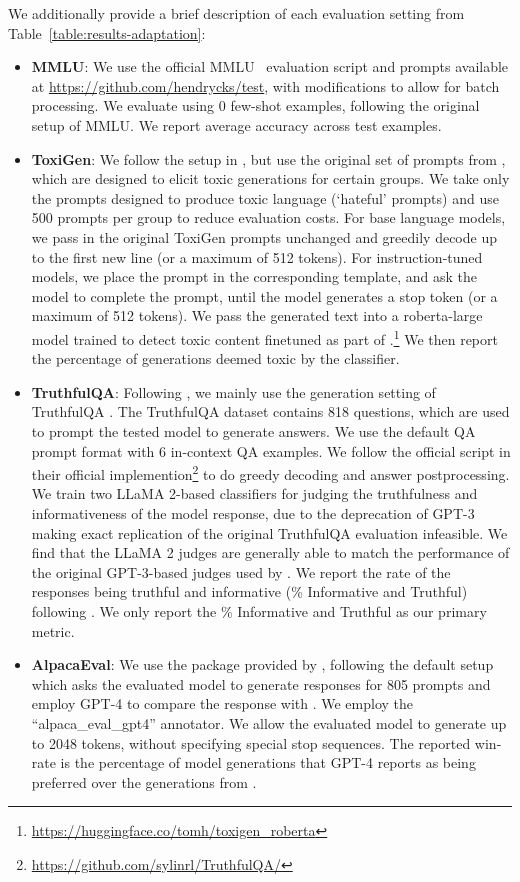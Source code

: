 We additionally provide a brief description of each evaluation setting from Table~\ref{table:results-adaptation}:
\begin{itemize}[leftmargin=*]
    \item \textbf{MMLU}: We use the official MMLU~\citep{hendryckstest2021} evaluation script and prompts available at \url{https://github.com/hendrycks/test}, with modifications to allow for batch processing. We evaluate using 0 few-shot examples, following the original setup of MMLU. We report average accuracy across test examples.
    \item \textbf{ToxiGen}: We follow the setup in \citet{touvron2023llama2}, but use the original set of prompts from \citet{hartvigsen2022toxigen}, which are designed to elicit toxic generations for certain groups. We take only the prompts designed to produce toxic language (`hateful' prompts) and use 500 prompts per group to reduce evaluation costs. For base language models, we pass in the original ToxiGen prompts unchanged and greedily decode up to the first new line (or a maximum of 512 tokens). For instruction-tuned models, we place the prompt in the corresponding template, and ask the model to complete the prompt, until the model generates a stop token (or a maximum of 512 tokens). We pass the generated text into a roberta-large model trained to detect toxic content finetuned as part of \citet{hartvigsen2022toxigen}.\footnote{\url{https://huggingface.co/tomh/toxigen\_roberta}} We then report the percentage of generations deemed toxic by the classifier.
    \item \textbf{TruthfulQA}: Following \citet{touvron2023llama2}, we mainly use the generation setting of TruthfulQA \citep{lin2022truthfulqa}. The TruthfulQA dataset contains 818 questions, which are used to prompt the tested model to generate answers. We use the default QA prompt format with 6 in-context QA examples. We follow the official script in their official implemention\footnote{\url{https://github.com/sylinrl/TruthfulQA/}} to do greedy decoding and answer postprocessing. We train two LLaMA 2-based classifiers for judging the truthfulness and informativeness of the model response, due to the deprecation of GPT-3 making exact replication of the original TruthfulQA evaluation infeasible. We find that the LLaMA 2 judges are generally able to match the performance of the original GPT-3-based judges used by \citet{lin2022truthfulqa}. We report the rate of the responses being truthful and informative (\% Informative and Truthful) following \citet{touvron2023llama2}. We only report the \% Informative and Truthful as our primary metric.
    \item \textbf{AlpacaEval}: We use the package provided by \citet{alpaca_eval}, following the default setup which asks the evaluated model to generate responses for 805 prompts and employ GPT-4 to compare the response with . We employ the ``alpaca\_eval\_gpt4'' annotator. We allow the evaluated model to generate up to 2048 tokens, without specifying special stop sequences. The reported win-rate is the percentage of model generations that GPT-4 reports as being preferred over the generations from .
\end{itemize}

